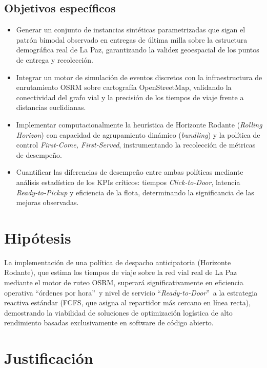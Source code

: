 \documentclass[12pt,letterpaper,oneside]{book}
\begin{document}
\subsection{Objetivos específicos}
\begin{itemize}
	\item Generar un conjunto de instancias sintéticas parametrizadas que sigan el patrón bimodal
	observado en entregas de última milla \citep{Wu2023LaDe} sobre la estructura demográfica real de La Paz, garantizando la
	validez geoespacial de los puntos de entrega y recolección.
	
	\item Integrar un motor de simulación de eventos discretos con la infraestructura de enrutamiento OSRM sobre 
	cartografía OpenStreetMap, validando la conectividad del grafo vial y la precisión de los tiempos de 
	viaje frente a distancias euclidianas.
	
	\item Implementar computacionalmente la heurística de Horizonte Rodante (\textit{Rolling Horizon})
	con capacidad de agrupamiento dinámico (\textit{bundling}) y la política de control \textit{First-Come,
		First-Served}, instrumentando la recolección de métricas de desempeño.
	
	\item Cuantificar las diferencias de desempeño entre ambas políticas mediante análisis estadístico de 
	los KPIs críticos: tiempos \textit{Click-to-Door}, latencia \textit{Ready-to-Pickup} y eficiencia de la 
	flota, determinando la significancia de las mejoras observadas.
	
\end{itemize}

\section{Hipótesis}
La implementación de una política de despacho anticipatoria (Horizonte Rodante), que estima los tiempos de viaje
sobre la red vial real de La Paz mediante el motor de ruteo OSRM, superará significativamente en eficiencia operativa
\textquotedblleft órdenes por hora\textquotedblright\ y nivel de servicio \textquotedblleft\textit{Ready-to-Door}\textquotedblright\ a la estrategia reactiva estándar (FCFS, que asigna al
repartidor más cercano en línea recta), demostrando la viabilidad de soluciones de optimización logística de alto rendimiento basadas
exclusivamente en software de código abierto.

\section{Justificación}
\end{document}
